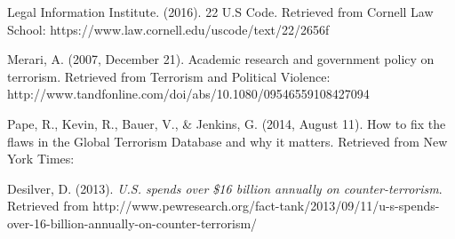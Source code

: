 \documentclass[10pt,a4paper]{article}
\begin{document}
\begin{thebibliography}{9}
Legal Information Institute. (2016). 22 U.S Code. 
Retrieved from Cornell Law School: https://www.law.cornell.edu/uscode/text/22/2656f

Merari, A. (2007, December 21). Academic research and government policy on terrorism. 
Retrieved from Terrorism and Political Violence: http://www.tandfonline.com/doi/abs/10.1080/09546559108427094

Pape, R., Kevin, R., Bauer, V., \& Jenkins, G. (2014, August 11). How to fix the flaws in the Global Terrorism Database and why it matters. Retrieved from New York Times: 

Desilver, D. (2013). \textit{U.S. spends over \$16 billion annually on counter-terrorism}.
Retrieved from http://www.pewresearch.org/fact-tank/2013/09/11/u-s-spends-over-16-billion-annually-on-counter-terrorism/

\end{thebibliography}
\end{document}

